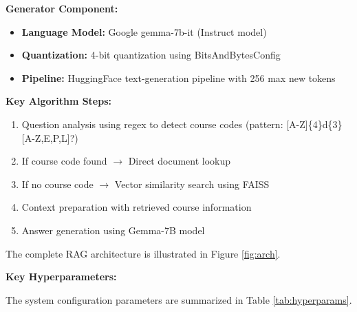 \documentclass[conference]{IEEEtran}
\begin{document}
\textbf{Generator Component:}
\begin{itemize}
    \item \textbf{Language Model:} Google gemma-7b-it (Instruct model)
    \item \textbf{Quantization:} 4-bit quantization using BitsAndBytesConfig
    \item \textbf{Pipeline:} HuggingFace text-generation pipeline with 256 max new tokens
\end{itemize}

\textbf{Key Algorithm Steps:}
\begin{enumerate}
    \item Question analysis using regex to detect course codes (pattern: [A-Z]\{4\}d\{3\}[A-Z,E,P,L]?)
    \item If course code found $\rightarrow$ Direct document lookup
    \item If no course code $\rightarrow$ Vector similarity search using FAISS
    \item Context preparation with retrieved course information
    \item Answer generation using Gemma-7B model
\end{enumerate}

The complete RAG architecture is illustrated in Figure \ref{fig:arch}.

\textbf{Key Hyperparameters:}

The system configuration parameters are summarized in Table \ref{tab:hyperparams}.

\begin{table}[t!]
\caption{Key Hyperparameters}
\centering
{}
\label{tab:hyperparams}
\end{table}
\end{document}
